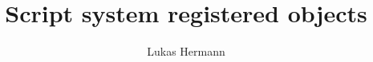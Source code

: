 \documentclass[12pt, a4paper]{article}
\begin{document}
\title{Script system registered objects}
\author{Lukas Hermann}
\maketitle

\tableofcontents

\newpage


\end{document}
